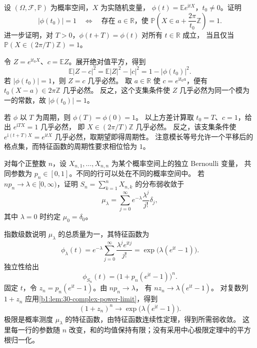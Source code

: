 \begin{optionalexercise}\label{b1:ex:30-lattice-characteristic}
设 \((\Omega,\mathcal F,\mathbb P)\) 为概率空间，\(X\) 为实随机变量，
\(\phi(t)=\mathbb E e^{\mathrm itX}\)，\(t_0\ne0\)。证明
\[
 |\phi(t_0)|=1
 \quad\Longleftrightarrow\quad
 \text{存在 }a\in\mathbb R\text{，使 }
 \mathbb P\left(X\in a+\frac{2\pi}{t_0}\mathbb Z\right)=1.
\]
进一步证明，对 \(T>0\)，\(\phi(t+T)=\phi(t)\) 对所有 \(t\in\mathbb R\) 成立，
当且仅当 \(\mathbb P(X\in(2\pi/T)\mathbb Z)=1\)。
\end{optionalexercise}
\begin{solution}
令 \(Z=e^{\mathrm it_0X}\)、\(c=\mathbb EZ\)。展开绝对值平方，得到
\[
 \mathbb E|Z-c|^2=\mathbb E|Z|^2-|c|^2=1-|\phi(t_0)|^2.
\]
若 \(|\phi(t_0)|=1\)，则 \(Z=c\) 几乎必然。
取 \(a\in\mathbb R\) 使 \(c=e^{\mathrm it_0a}\)，便有
\(t_0(X-a)\in2\pi\mathbb Z\) 几乎必然。
反之，这个支集条件使 \(Z\) 几乎必然为同一个模为一的常数，故 \(|\phi(t_0)|=1\)。

若 \(\phi\) 以 \(T\) 为周期，则 \(\phi(T)=\phi(0)=1\)。
以上方差计算取 \(t_0=T\)、\(c=1\)，给出 \(e^{\mathrm iTX}=1\) 几乎必然，
即 \(X\in(2\pi/T)\mathbb Z\) 几乎必然。
反之，该支集条件使
\(e^{\mathrm i(t+T)X}=e^{\mathrm itX}\) 几乎必然，取期望即得周期性。
注意模长等号允许一个平移后的格点集，而特征函数的周期性要求相位恰为 \(1\)。
\end{solution}

\begin{optionalexercise}\label{b1:ex:30-poisson-limit}
对每个正整数 \(n\)，设 \(X_{n,1},\ldots,X_{n,n}\) 为某个概率空间上的独立 Bernoulli 变量，
共同参数为 \(p_n\in[0,1]\)。不同的行可以处在不同的概率空间中。
若 \(np_n\to\lambda\in[0,\infty)\)，证明 \(S_n=\sum_{k=1}^nX_{n,k}\) 的分布弱收敛于
\[
 \mu_\lambda=\sum_{j=0}^{\infty}e^{-\lambda}\frac{\lambda^j}{j!}\delta_j,
\]
其中 \(\lambda=0\) 时约定 \(\mu_0=\delta_0\)。
\end{optionalexercise}
\begin{solution}
指数级数说明 \(\mu_\lambda\) 的总质量为一，其特征函数为
\[
 \phi_\lambda(t)
 =e^{-\lambda}\sum_{j=0}^{\infty}\frac{\lambda^je^{\mathrm itj}}{j!}
 =\exp\bigl(\lambda(e^{\mathrm it}-1)\bigr).
\]
独立性给出
\[
 \phi_{S_n}(t)=\bigl(1+p_n(e^{\mathrm it}-1)\bigr)^n.
\]
固定 \(t\)，令 \(z_n=p_n(e^{\mathrm it}-1)\)。由 \(np_n\to\lambda\)，
有 \(nz_n\to\lambda(e^{\mathrm it}-1)\)。
对复数列 \(1+z_n\) 应用\cref{b1:lem:30-complex-power-limit}，得到
\[
 (1+z_n)^n\longrightarrow\exp\bigl(\lambda(e^{\mathrm it}-1)\bigr).
\]
极限是概率测度 \(\mu_\lambda\) 的特征函数，由特征函数连续性定理，得到所需弱收敛。
这里每一行的参数随 \(n\) 改变，和的均值保持有限；没有采用中心极限定理中的平方根归一化。
\end{solution}

